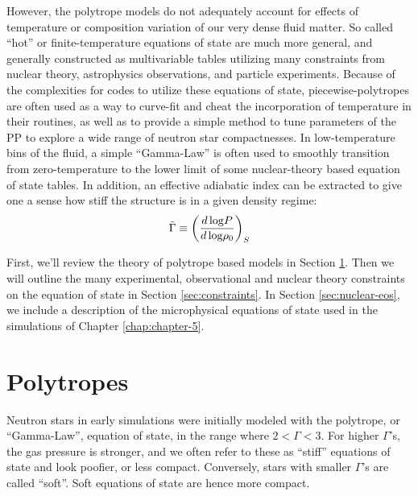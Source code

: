 However, the polytrope models do not adequately account for effects of temperature or composition variation of our very dense fluid matter.  
So called ``hot'' or finite-temperature equations of state are much more general, and generally constructed as multivariable tables utilizing many constraints from nuclear theory, astrophysics observations, and particle experiments.
Because of the complexities for codes to utilize these equations of state, piecewise-polytropes are often used as a way to curve-fit and cheat the incorporation of temperature in their routines, as well as to provide a simple method to tune parameters of the PP to explore a wide range of neutron star compactnesses.
In low-temperature bins of the fluid, a simple ``Gamma-Law'' is often used to smoothly transition from zero-temperature to the lower limit of some nuclear-theory based equation of state tables.
In addition, an effective adiabatic index can be extracted to give one a sense how stiff the structure is in a given density regime:
\begin{align}
\label{e:adiabat}
\tilde{\Gamma} \equiv \left( \frac{d\, {\rm log} P}{d\, {\rm log} \rho_0} \right) _S
\end{align}

First, we'll review the theory of polytrope based models in Section \ref{sec:polytropes}. Then we will outline the many experimental, observational and nuclear theory constraints on the equation of state in Section \ref{sec:constraints}.   In Section \ref{sec:nuclear-eos}, we include a description of the microphysical equations of state used in the simulations of Chapter \ref{chap:chapter-5}. 


\section{Polytropes}
\label{sec:polytropes}

Neutron stars in early simulations were initially modeled with the polytrope, or ``Gamma-Law'', equation of state, in the range where $2 < \Gamma < 3$.
For higher $\Gamma$'s, the gas pressure is stronger, and we often refer to these as ``stiff'' equations of state and look poofier, or less compact.
Conversely, stars with smaller $\Gamma$'s are called ``soft''.  Soft equations of state are hence more compact.

